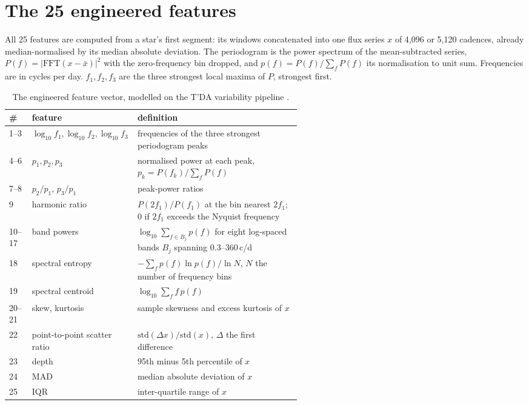 \documentclass{article}
\begin{document}
\section{The 25 engineered features}
\label{app:features}

All 25 features are computed from a star's first segment: its windows concatenated into one flux
series $x$ of 4{,}096 or 5{,}120 cadences, already median-normalised by its median absolute
deviation. The periodogram is the power spectrum of the mean-subtracted series,
$P(f) = |\mathrm{FFT}(x - \bar{x})|^{2}$ with the zero-frequency bin dropped, and
$p(f) = P(f)/\sum_f P(f)$ its normalisation to unit sum. Frequencies are in cycles per day.
$f_{1}, f_{2}, f_{3}$ are the three strongest local maxima of $P$, strongest first.

\begin{table}[H]
\caption{The engineered feature vector, modelled on the T'DA variability pipeline \citep{audenaert2021}.}
\label{tab:features}
\centering
\small
\begin{tabular}{llp{0.56\linewidth}}
\toprule
\# & feature & definition \\
\midrule
1--3 & $\log_{10} f_{1}, \log_{10} f_{2}, \log_{10} f_{3}$ & frequencies of the three strongest periodogram peaks \\
4--6 & $p_{1}, p_{2}, p_{3}$ & normalised power at each peak, $p_{k} = P(f_{k})/\sum_f P(f)$ \\
7--8 & $p_{2}/p_{1}$, $p_{3}/p_{1}$ & peak-power ratios \\
9 & harmonic ratio & $P(2f_{1})/P(f_{1})$ at the bin nearest $2f_{1}$; $0$ if $2f_{1}$ exceeds the Nyquist frequency \\
10--17 & band powers & $\log_{10} \sum_{f \in B_{j}} p(f)$ for eight log-spaced bands $B_{j}$ spanning 0.3--360\,c/d \\
18 & spectral entropy & $-\sum_f p(f)\ln p(f) / \ln N$, $N$ the number of frequency bins \\
19 & spectral centroid & $\log_{10} \sum_f f\,p(f)$ \\
20--21 & skew, kurtosis & sample skewness and excess kurtosis of $x$ \\
22 & point-to-point scatter ratio & $\mathrm{std}(\Delta x)/\mathrm{std}(x)$, $\Delta$ the first difference \\
23 & depth & 95th minus 5th percentile of $x$ \\
24 & MAD & median absolute deviation of $x$ \\
25 & IQR & inter-quartile range of $x$ \\
\bottomrule
\end{tabular}
\end{table}
\end{document}
